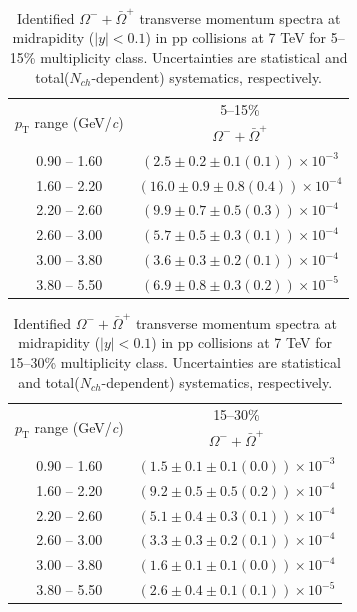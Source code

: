 \begin{table}
\caption{Identified $\Omega^{-} + \bar{\Omega}^{+}$ transverse momentum spectra at midrapidity ($|y|<0.1$) in pp collisions at 7 TeV for 5--15\% multiplicity class. Uncertainties are statistical and total($N_{ch}$-dependent) systematics, respectively.}
\label{tab:OmegaSum_5to15}
\begin{center}
\begin{tabular}{ c | c }
\hline
\multirow{2}{*}{$p_{\mathrm{T}}$ range (GeV/\textit{c})} & \multicolumn{1}{c}{5--15\%} \\ & $\Omega^{-} + \bar{\Omega}^{+}$\\ 
\hline
0.90 -- 1.60 & $(2.5\pm0.2\pm0.1(0.1))\times10^{-3}$ \\ 
1.60 -- 2.20 & $(16.0\pm0.9\pm0.8(0.4))\times10^{-4}$ \\ 
2.20 -- 2.60 & $(9.9\pm0.7\pm0.5(0.3))\times10^{-4}$ \\ 
2.60 -- 3.00 & $(5.7\pm0.5\pm0.3(0.1))\times10^{-4}$ \\ 
3.00 -- 3.80 & $(3.6\pm0.3\pm0.2(0.1))\times10^{-4}$ \\ 
3.80 -- 5.50 & $(6.9\pm0.8\pm0.3(0.2))\times10^{-5}$ \\ 
\hline
\end{tabular}
\end{center}
\end{table}
 
\begin{table}
\caption{Identified $\Omega^{-} + \bar{\Omega}^{+}$ transverse momentum spectra at midrapidity ($|y|<0.1$) in pp collisions at 7 TeV for 15--30\% multiplicity class. Uncertainties are statistical and total($N_{ch}$-dependent) systematics, respectively.}
\label{tab:OmegaSum_15to30}
\begin{center}
\begin{tabular}{ c | c }
\hline
\multirow{2}{*}{$p_{\mathrm{T}}$ range (GeV/\textit{c})} & \multicolumn{1}{c}{15--30\%} \\ & $\Omega^{-} + \bar{\Omega}^{+}$\\ 
\hline
0.90 -- 1.60 & $(1.5\pm0.1\pm0.1(0.0))\times10^{-3}$ \\ 
1.60 -- 2.20 & $(9.2\pm0.5\pm0.5(0.2))\times10^{-4}$ \\ 
2.20 -- 2.60 & $(5.1\pm0.4\pm0.3(0.1))\times10^{-4}$ \\ 
2.60 -- 3.00 & $(3.3\pm0.3\pm0.2(0.1))\times10^{-4}$ \\ 
3.00 -- 3.80 & $(1.6\pm0.1\pm0.1(0.0))\times10^{-4}$ \\ 
3.80 -- 5.50 & $(2.6\pm0.4\pm0.1(0.1))\times10^{-5}$ \\ 
\hline
\end{tabular}
\end{center}
\end{table}
 
